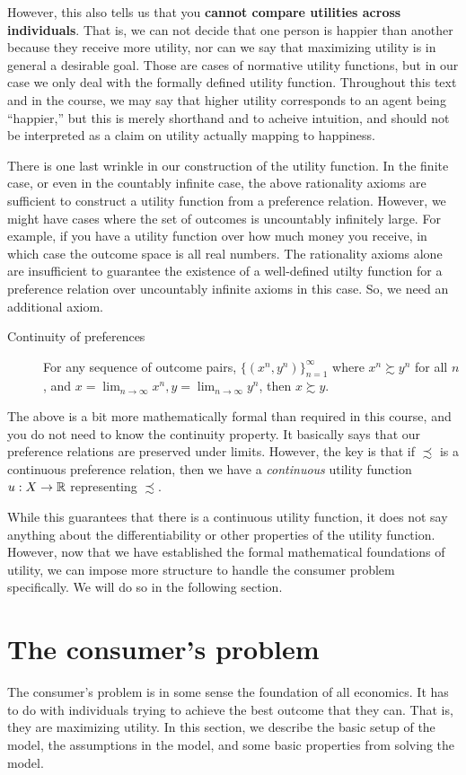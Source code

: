 However, this also tells us that you \textbf{cannot compare utilities across individuals}. That is, we can not decide that one person is happier than another because they receive more utility, nor can we say that maximizing utility is in general a desirable goal. Those are cases of normative utility functions, but in our case we only deal with the formally defined utility function. Throughout this text and in the course, we may say that higher utility corresponds to an agent being ``happier,'' but this is merely shorthand and to acheive intuition, and should not be interpreted as a claim on utility actually mapping to happiness. 

There is one last wrinkle in our construction of the utility function. In the finite case, or even in the countably infinite case, the above rationality axioms are sufficient to construct a utility function from a preference relation. However, we might have cases where the set of outcomes is uncountably infinitely large. For example, if you have a utility function over how much money you receive, in which case the outcome space is all real numbers. The rationality axioms alone are insufficient to guarantee the existence of a well-defined utilty function for a preference relation over uncountably infinite axioms in this case. So, we need an additional axiom.
\begin{description}
    \item[Continuity of preferences] For any sequence of outcome pairs, $\{(x^n, y^n)\}_{n = 1}^\infty$ where $x^n \succsim y^n$ for all $n$, and $x = \lim_{n \to \infty} x^n, y = \lim_{n \to \infty} y^n$, then $x \succsim y$. 
\end{description}
The above is a bit more mathematically formal than required in this course, and you do not need to know the continuity property. It basically says that our preference relations are preserved under limits. However, the key is that if $\precsim$ is a continuous preference relation, then we have a \emph{continuous} utility function $u: X \to \mathbb{R}$ representing $\precsim$. 

While this guarantees that there is a continuous utility function, it does not say anything about the differentiability or other properties of the utility function. However, now that we have established the formal mathematical foundations of utility, we can impose more structure to handle the consumer problem specifically. We will do so in the following section.

\section{The consumer's problem}
The consumer's problem is in some sense the foundation of all economics. It has to do with individuals trying to achieve the best outcome that they can. That is, they are maximizing utility. In this section, we describe the basic setup of the model, the assumptions in the model, and some basic properties from solving the model.

